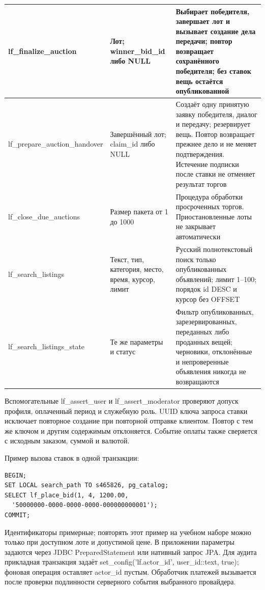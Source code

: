 \begin{longtable}{|>{\RaggedRight\arraybackslash}p{0.30\tablecontentwidth}|>{\RaggedRight\arraybackslash}p{0.35\tablecontentwidth}|>{\RaggedRight\arraybackslash}p{0.35\tablecontentwidth}|}
lf\_\allowbreak{}finalize\_\allowbreak{}auction & Лот; winner\_\allowbreak{}bid\_\allowbreak{}id либо NULL & Выбирает победителя, завершает лот и вызывает создание дела передачи; повтор возвращает сохранённого победителя; без ставок вещь остаётся опубликованной \\ \hline
lf\_\allowbreak{}prepare\_\allowbreak{}auction\_\allowbreak{}handover & Завершённый лот; claim\_\allowbreak{}id либо NULL & Создаёт одну принятую заявку победителя, диалог и передачу; резервирует вещь. Повтор возвращает прежнее дело и не меняет подтверждения. Истечение подписки после ставки не отменяет результат торгов \\ \hline
lf\_\allowbreak{}close\_\allowbreak{}due\_\allowbreak{}auctions & Размер пакета от 1 до 1000 & Процедура обработки просроченных торгов. Приостановленные лоты не закрывает автоматически \\ \hline
lf\_\allowbreak{}search\_\allowbreak{}listings & Текст, тип, категория, место, время, курсор, лимит & Русский полнотекстовый поиск только опубликованных объявлений; лимит 1–100; порядок id DESC и курсор без OFFSET \\ \hline
lf\_\allowbreak{}search\_\allowbreak{}listings\_\allowbreak{}state & Те же параметры и статус & Фильтр опубликованных, зарезервированных, переданных либо проданных вещей; черновики, отклонённые и непроверенные объявления никогда не возвращаются \\ \hline
\end{longtable}
\endgroup

Вспомогательные lf\_\allowbreak{}assert\_\allowbreak{}user и lf\_\allowbreak{}assert\_\allowbreak{}moderator проверяют допуск профиля, оплаченный период и служебную роль. UUID ключа запроса ставки исключает повторное создание при повторной отправке клиентом. Повтор с тем же ключом и другим содержимым отклоняется. Событие оплаты также сверяется с исходным заказом, суммой и валютой.

Пример вызова ставок в одной транзакции:

\begin{Verbatim}[breaklines=true,breakanywhere=true,fontsize=\footnotesize]
BEGIN;
SET LOCAL search_path TO s465826, pg_catalog;
SELECT lf_place_bid(1, 4, 1200.00,
  '50000000-0000-0000-0000-000000000001');
COMMIT;
\end{Verbatim}

Идентификаторы примерные; повторять этот пример на учебном наборе можно только при доступном лоте и допустимой цене. В приложении параметры задаются через JDBC Prepared\allowbreak{}Statement или нативный запрос JPA. Для аудита прикладная транзакция задаёт set\_\allowbreak{}config('lf.actor\_\allowbreak{}id', user\_\allowbreak{}id::text, true); фоновая операция оставляет actor\_\allowbreak{}id пустым. Обработчик платежей вызывается после проверки подлинности серверного события выбранного провайдера.

